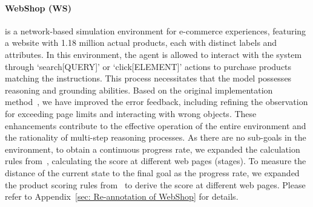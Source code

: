 \paragraph{WebShop (WS)~\citep{yao2022webshop}}
is a network-based simulation environment for e-commerce experiences, featuring a website with 1.18 million actual products, each with distinct labels and attributes. In this environment, the agent is allowed to interact with the system through `search[QUERY]' or `click[ELEMENT]' actions to purchase products matching the instructions. 
This process necessitates that the model possesses reasoning and grounding abilities.
Based on the original implementation method~\citep{yao2022webshop,shinn2023reflexion}, we have improved the error feedback, including refining the observation for exceeding page limits and interacting with wrong objects. These enhancements contribute to the effective operation of the entire environment and the rationality of multi-step reasoning processes.
As there are no sub-goals in the environment, to obtain a continuous progress rate, we expanded the calculation rules from~\citep{yao2022webshop}, calculating the score at different web pages (stages). 
To measure the distance of the current state to the final goal as the progress rate, we expanded the product scoring rules from~\citet{yao2022webshop} to derive the score at different web pages. Please refer to Appendix~\ref{sec: Re-annotation of WebShop} for details.

